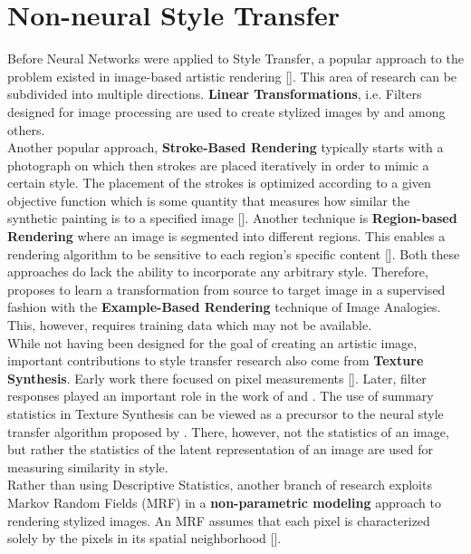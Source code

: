 \documentclass{seminar}
\begin{document}
	\section{Non-neural Style Transfer}
	Before Neural Networks were applied to Style Transfer, a popular approach to the problem existed in image-based artistic rendering [\cite{kyprianidis2012state}]. This area of research can be subdivided into multiple directions. \textbf{Linear Transformations}, i.e. Filters designed for image processing are used to create stylized images by \cite{winnemoller2006real} and \cite{tomasi1998bilateral} among others.\\ 
	Another popular approach, \textbf{Stroke-Based Rendering} typically starts with a photograph on which then strokes are placed iteratively in order to mimic a certain style. The placement of the strokes is optimized according to a given objective function which is some quantity that measures how similar the synthetic painting is to a specified image [\cite{hertzmann2003survey}]. Another technique is \textbf{Region-based Rendering} where an image is segmented into different regions. This enables a rendering algorithm to be sensitive to each region's specific content [\cite{kolliopoulos2005image}]. Both these approaches do lack the ability to incorporate any arbitrary style. Therefore, \cite{hertzmann2001image} proposes to learn a transformation from source to target image in a supervised fashion with the \textbf{Example-Based Rendering} technique of Image Analogies. This, however, requires training data which may not be available.\\
	While not having been designed for the goal of creating an artistic image, important contributions to style transfer research also come from \textbf{Texture Synthesis}. 
	Early work there focused on pixel measurements [\cite{julesz1962visual}].
	Later, filter responses played an important role in the work of \cite{heeger1995pyramid} and \cite{portilla2000parametric}. The use of summary statistics in Texture Synthesis can be viewed as a precursor to the neural style transfer algorithm proposed by \cite{gatys2015neural}. There, however, not the statistics of an image, but rather the statistics of the latent representation of an image are used for measuring similarity in style.\\
	Rather than using Descriptive Statistics, another branch of research exploits Markov Random Fields (MRF) in a \textbf{non-parametric modeling} approach to rendering stylized images. An MRF assumes that each pixel is characterized solely by the pixels in its spatial neighborhood [\cite{jing2019neural}].
\end{document}
